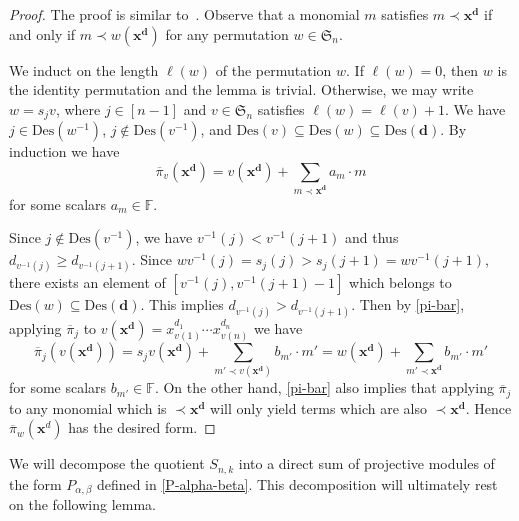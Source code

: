 \documentclass[ALCO,ThmDefs,published]{cedram}
\newcommand{\symm}{{\mathfrak{S}}}
\newcommand{\xx}{{\mathbf {x}}}
\newcommand{\FF}{{\mathbb{F}}}
\theoremstyle{plain}
\newcommand{\Des}{{\mathrm {Des}}}
\newcommand{\symm}{{\mathfrak{S}}}
\newcommand{\FF}{{\mathbb{F}}}
\newcommand{\xx}{{\mathbf {x}}}
\newcommand{\dd}{{\mathbf {d}}}
\newcommand{\pib}{\overline{\pi}}
\begin{document}
\begin{proof}
The proof is similar to~\cite[Lem. 4.1]{Huang}.
Observe that a monomial $m$ satisfies $m \prec \xx^{\dd}$ if and only if $m \prec w(\xx^{\dd})$ for any permutation 
$w \in \symm_n$.

We induct on the length $\ell(w)$ of the permutation $w$.  If $\ell(w) = 0$, then $w$ is the identity permutation
and the lemma is trivial.  Otherwise, we may write $w = s_j v$, where $j\in[n-1]$ and $v \in \symm_n$ satisfies $\ell(w) = \ell(v) + 1$.
We have $j\in \Des(w^{-1})$, $j\notin \Des(v^{-1})$, and $\Des(v) \subseteq \Des(w)\subseteq \Des(\dd)$.
By induction we have
\begin{equation}
\pib_v(\xx^{\dd}) = v(\xx^{\dd}) + \sum_{m \prec \xx^{\dd}} a_m \cdot m
\end{equation}
for some scalars $a_m \in \FF$.

Since $j\notin \Des(v^{-1})$, we have $v^{-1}(j) < v^{-1}(j+1)$ and thus $d_{v^{-1}(j)} \geq d_{v^{-1}(j+1)}$.
Since $wv^{-1}(j) = s_j(j) > s_j(j+1) = wv^{-1}(j+1)$, there exists an element of $[v^{-1}(j),v^{-1}(j+1)-1]$ which belongs to $\Des(w)\subseteq \Des(\dd)$.
This implies $d_{v^{-1}(j)} > d_{v^{-1}(j+1)}$.
Then by \eqref{pi-bar}, applying $\pib_j$ to $v(\xx^{\dd}) = x_{v(1)}^{d_1}\cdots x_{v(n)}^{d_n}$ we have
\begin{equation}
\pib_j(v(\xx^{\dd})) = s_j v(\xx^{\dd}) + \sum_{m' \prec v(\xx^{\dd})} b_{m'} \cdot m' = w(\xx^{\dd}) +
 \sum_{m' \prec \xx^{\dd}} b_{m'} \cdot m'
\end{equation}
for some scalars $b_{m'} \in \FF$.
On the other hand, \eqref{pi-bar} also implies that applying $\pib_j$ to any monomial which is $\prec \xx^{\dd}$
will only yield terms which are also $\prec \xx^{\dd}$.
Hence $\pib_w(\xx^d)$ has the desired form.
\end{proof}


We will decompose the quotient $S_{n,k}$ into a direct sum of projective modules of the form $P_{\alpha,\beta}$ defined in \eqref{P-alpha-beta}.
This decomposition will ultimately rest on the following lemma.
\end{document}
